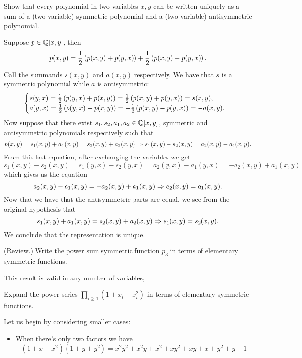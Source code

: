 \documentclass[12pt]{memoir}
\begin{document}
\begin{Ej}[Exercise 1]
    Show that every polynomial in two variables $x,y$ can be written uniquely as a sum of a
    (two variable) symmetric polynomial and a (two variable) antisymmetric polynomial.
\end{Ej}

\begin{ptcbr}
Suppose $p\in\mathbb{Q}[x,y]$, then 
$$p(x,y)=\half\left(p(x,y)+p(y,x)\right)+\half\left(p(x,y)-p(y,x)\right).$$
Call the summands $s(x,y)$ and $a(x,y)$ respectively. We have that $s$ is a symmetric polynomial while $a$ is antisymmetric:
$$\begin{cases}
    s(y,x)=\half\left(p(y,x)+p(x,y)\right)=\half\left(p(x,y)+p(y,x)\right)=s(x,y),\\
    a(y,x)=\half\left(p(y,x)-p(x,y)\right)=-\half\left(p(x,y)-p(y,x)\right)=-a(x,y).
\end{cases}$$
Now suppose that there exist $s_1,s_2,a_1,a_2\in\mathbb{Q}[x,y]$, symmetric and antisymmetric polynomials respectively such that 
$$p(x,y)=s_1(x,y)+a_1(x,y)=s_2(x,y)+a_2(x,y)\Rightarrow s_1(x,y)-s_2(x,y)=a_2(x,y)-a_1(x,y).$$
From this last equation, after exchanging the variables we get
$$s_1(x,y)-s_2(x,y)=s_1(y,x)-s_2(y,x)=a_2(y,x)-a_1(y,x)=-a_2(x,y)+a_1(x,y)$$ 
which gives us the equation 
$$a_2(x,y)-a_1(x,y)=-a_2(x,y)+a_1(x,y)\Rightarrow a_2(x,y)=a_1(x,y).$$
Now that we have that the antisymmetric parts are equal, we see from the original hypothesis that 
$$s_1(x,y)+a_1(x,y)=s_2(x,y)+a_2(x,y)\Rightarrow s_1(x,y)=s_2(x,y).$$
We conclude that the representation is unique.
\end{ptcbr}

\begin{Ej}[Exercise 2]
    (Review.) Write the power sum symmetric function $p_3$ in terms of elementary symmetric
functions.
\end{Ej}

\begin{ptcbr}
This result is valid in any number of variables,
\end{ptcbr}

\begin{Ej}
 Expand the power series $\prod_{i\geq 1}(1+x_i+x_i^2)$ in terms of elementary symmetric functions.
\end{Ej}

\begin{ptcbr}
Let us begin by considering smaller cases:
\begin{itemize}
    \itemsep=-0.4em
    \item When there's only two factors we have 
$$(1+x+x^2)(1+y+y^2)=x^2 y^2 + x^2 y + x^2 + x y^2 + x y + x + y^2 + y + 1$$
\end{itemize}
\end{ptcbr}
\end{document}
